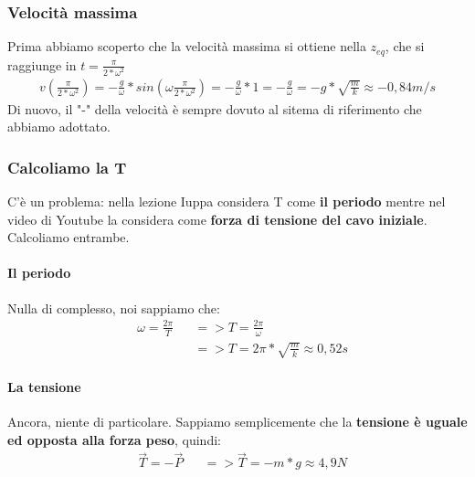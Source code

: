         \subsubsection{Velocità massima}
            Prima abbiamo scoperto che la velocità massima si ottiene nella $z_{eq}$, che si raggiunge in $t=\frac{\pi}{2*\omega^2}$
            \begin{align*}
                v(\frac{\pi}{2*\omega^2})=-\frac{g}{\omega}*sin(\omega \frac{\pi}{2*\omega^2})=-\frac{g}{\omega}*1 = -\frac{g}{\omega} = -g*\sqrt{\frac{m}{k}}\approx-0,84m/s
            \end{align*}
            Di nuovo, il "-" della velocità è sempre dovuto al sitema di riferimento che abbiamo adottato.

        \subsubsection{Calcoliamo la T}
            C'è un problema: nella lezione Iuppa considera T come \textbf{il periodo} mentre nel video di Youtube la considera come \textbf{forza di tensione del cavo iniziale}. Calcoliamo entrambe.

            \paragraph{Il periodo}
                Nulla di complesso, noi sappiamo che:
                \begin{align*}
                    &\omega=\frac{2\pi}{T}&&=>T=\frac{2\pi}{\omega}\\
                    & &&=> T=2\pi*\sqrt{\frac{m}{k}}\approx 0,52s
                \end{align*}

            \paragraph{La tensione}
                Ancora, niente di particolare. Sappiamo semplicemente che la \textbf{tensione è uguale ed opposta alla forza peso}, quindi:
                \begin{align*}
                    &\vec{T}=-\vec{P} &&=> \vec{T}=-m*g\approx 4,9N
                \end{align*}

